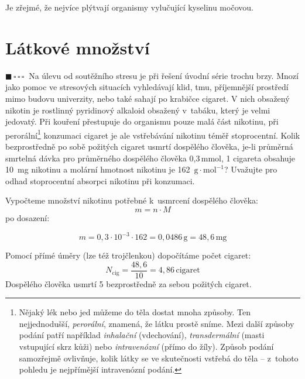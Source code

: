\documentclass{book}
\newcommand{\jeden}{$\blacksquare \, \square \, \square \, \square \; \; $}
\renewenvironment{quotation}{\par}{\par} %
\begin{document}
Je zřejmé, že nejvíce plýtvají organismy vylučující kyselinu močovou.

\newpage %

\section{Látkové množství}

\begin{quotation}
\jeden Na úlevu od soutěžního stresu je při řešení úvodní série trochu brzy.
Mnozí jako pomoc ve stresových situacích vyhledávají klid, tmu, příjemnější
prostředí mimo budovu univerzity, nebo také sahají po krabičce cigaret.
V nich obsažený nikotin je rostlinný pyridinový alkaloid obsažený
v~tabáku, který je velmi jedovatý. Při kouření přestupuje do organismu
pouze malá část nikotinu, při perorální\footnote{Nějaký lék nebo jed můžeme do těla dostat mnoha způsoby. Ten nejjednodušší, \textit{perorální}, znamená, že látku prostě sníme. Mezi další způsoby podání patří například \textit{inhalační} (vdechování), \textit{transdermální} (masti vstupující skrz kůži) nebo \textit{intravenózní} (přímo do žíly). Způsob podání samozřejmě ovlivňuje, kolik látky se ve skutečnosti vstřebá do těla -- z~tohoto pohledu je nejpřímější intravenózní podání.} konzumaci cigaret je ale vstřebávání
nikotinu téměř stoprocentní. Kolik bezprostředně po sobě požitých
cigaret usmrtí dospělého člověka, je-li průměrná smrtelná dávka pro
průměrného dospělého člověka 0,3\,mmol, 1 cigareta obsahuje 10~mg
nikotinu a molární hmotnost nikotinu je 162~$\mathrm{g\cdot mol^{-1}}$? Uvažujte pro odhad
stoprocentní absorpci nikotinu při konzumaci.
\end{quotation} \dotfill \par 
Vypočteme množství nikotinu potřebné k~usmrcení dospělého člověka:
\[
m=n\cdot M
\]
po dosazení: 

\[
m=0,3\cdot10^{-3}\cdot162=0,0486\,\mathrm{g=48,6\,\mathrm{mg}}
\]

Pomocí přímé úměry (lze též trojčlenkou) dopočítáme počet cigaret: 
\[
N_{\mathrm{cig}}=\frac{48,6}{10}=4,86\,\mathrm{cigaret}
\]
Dospělého člověka usmrtí 5 bezprostředně za sebou požitých cigaret.
\end{document}
